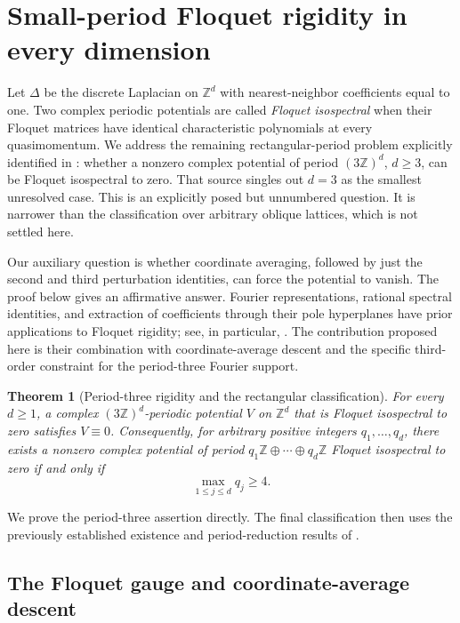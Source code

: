 \documentclass[11pt,a4paper]{article}
\newtheorem{theorem}{Theorem}
\theoremstyle{definition}
\theoremstyle{remark}\newtheorem{remark}[lemma]{Remark}
\newcommand{\Z}{\mathbb Z}\newcommand{\Q}{\mathbb Q}
\begin{document}
\section{Small-period Floquet rigidity in every dimension}
\label{sec:ternary-rigidity}

Let $\Delta$ be the discrete Laplacian on $\Z^d$ with nearest-neighbor
coefficients equal to one. Two complex periodic potentials are called
\emph{Floquet isospectral} when their Floquet matrices have identical
characteristic polynomials at every quasimomentum. We address the remaining
rectangular-period problem explicitly identified in
\cite[Section~4.4]{CFK}: whether a nonzero complex potential of period
$(3\Z)^d$, $d\geq3$, can be Floquet isospectral to zero. That source singles
out $d=3$ as the smallest unresolved case. This is an explicitly posed but
unnumbered question. It is narrower than the classification over arbitrary
oblique lattices, which is not settled here.

Our auxiliary question is whether coordinate averaging, followed by just the
second and third perturbation identities, can force the potential to vanish.
The proof below gives an affirmative answer. Fourier representations, rational
spectral identities, and extraction of coefficients through their pole
hyperplanes have prior applications to Floquet rigidity; see, in particular,
\cite[Lemma~3.2, Theorem~3.3, and Section~4]{Liu23}. The contribution proposed
here is their combination with coordinate-average descent and the specific
third-order constraint for the period-three Fourier support.

\begin{theorem}[Period-three rigidity and the rectangular classification]
\label{thm:ternary-rigidity}
For every $d\geq1$, a complex $(3\Z)^d$-periodic potential $V$ on $\Z^d$
that is Floquet isospectral to zero satisfies $V\equiv0$.
Consequently, for arbitrary positive integers $q_1,\ldots,q_d$, there exists
a nonzero complex potential of period
$q_1\Z\oplus\cdots\oplus q_d\Z$ Floquet isospectral to zero if and only if
\begin{equation}\label{eq:rectangular-threshold}
 \max_{1\leq j\leq d}q_j\geq4.
\end{equation}
\end{theorem}

We prove the period-three assertion directly. The final classification then
uses the previously established existence and period-reduction results of
\cite{CFK}.

\subsection{The Floquet gauge and coordinate-average descent}
\end{document}
